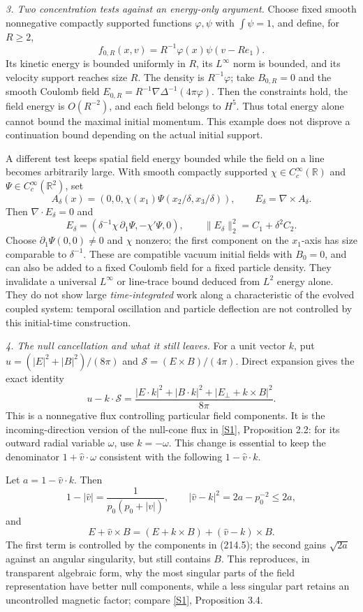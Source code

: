 \documentclass[11pt,a4paper]{article}
\newcommand{\R}{\mathbb{R}}
\newcommand{\sref}[2]{\hyperlink{source:#1:#2}{[S#2]}}
\begin{document}
\textit{3. Two concentration tests against an energy-only argument.}
Choose fixed smooth nonnegative compactly supported functions $\varphi,\psi$
with $\int\psi=1$, and define, for $R\ge2$,
\[
 f_{0,R}(x,v)=R^{-1}\varphi(x)\psi(v-Re_1).
\]
Its kinetic energy is bounded uniformly in $R$, its $L^\infty$ norm is
bounded, and its velocity support reaches size $R$. The density is
$R^{-1}\varphi$; take $B_{0,R}=0$ and the smooth Coulomb field
$E_{0,R}=R^{-1}\nabla\Delta^{-1}(4\pi\varphi)$. Then the constraints hold,
the field energy is $O(R^{-2})$, and each field belongs to $H^5$.
Thus total energy alone cannot bound the maximal initial momentum. This
example does not disprove a continuation bound depending on the actual
initial support.

A different test keeps spatial field energy bounded while the field on a
line becomes arbitrarily large. With smooth compactly supported
$\chi\in C_c^\infty(\R)$ and $\Psi\in C_c^\infty(\R^2)$, set
\[
 A_\delta(x)=(0,0,\chi(x_1)\Psi(x_2/\delta,x_3/\delta)),\qquad
 E_\delta=\nabla\times A_\delta.
\]
Then $\nabla\cdot E_\delta=0$ and
\[
 E_\delta=(\delta^{-1}\chi\,\partial_1\Psi,
                    -\chi'\Psi,0),\qquad
 \|E_\delta\|_2^2=C_1+\delta^2 C_2.
\]
Choose $\partial_1\Psi(0,0)\ne0$ and $\chi$ nonzero; the first component
on the $x_1$-axis has size comparable to $\delta^{-1}$. These are compatible
vacuum initial fields with $B_0=0$, and can also be added to a fixed Coulomb
field for a fixed particle density. They invalidate a universal
$L^\infty$ or line-trace bound deduced from $L^2$ energy alone. They do not
show large \emph{time-integrated} work along a characteristic of the evolved
coupled system: temporal oscillation and particle deflection are not
controlled by this initial-time construction.

\textit{4. The null cancellation and what it still leaves.}
For a unit vector $k$, put
$u=(|E|^2+|B|^2)/(8\pi)$ and $\mathcal S=(E\times B)/(4\pi)$.
Direct expansion gives the exact identity
\[
 u-k\cdot\mathcal S
 =\frac{|E\cdot k|^2+|B\cdot k|^2+|E_\perp+k\times B|^2}{8\pi}.
                                                               \tag{214.5}
\]
This is a nonnegative flux controlling particular field components. It is
the incoming-direction version of the null-cone flux in
\sref{statement}{1}, Proposition 2.2: for its outward radial variable $\omega$,
use $k=-\omega$. This change is essential to keep the denominator
$1+\widehat v\cdot\omega$ consistent with the following $1-\widehat v\cdot k$.

Let $a=1-\widehat v\cdot k$. Then
\[
 1-|\widehat v|=\frac{1}{p_0(p_0+|v|)},\qquad
 |\widehat v-k|^2=2a-p_0^{-2}\le2a,
\]
and
\[
 E+\widehat v\times B=(E+k\times B)+(\widehat v-k)\times B.
                                                               \tag{214.6}
\]
The first term is controlled by the components in (214.5); the second gains
$\sqrt{2a}$ against an angular singularity, but still contains $B$.
This reproduces, in transparent algebraic form, why the most singular
parts of the field representation have better null components, while a
less singular part retains an uncontrolled magnetic factor; compare
\sref{statement}{1}, Proposition 3.4.
\end{document}
